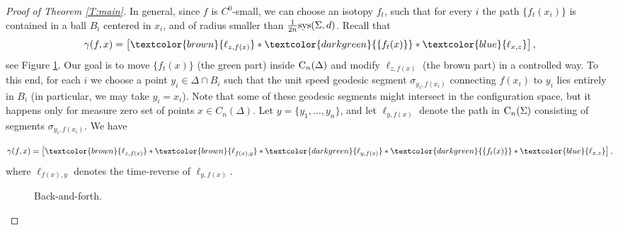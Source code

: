 \documentclass[11pt]{amsart}
\theoremstyle{definition}
\theoremstyle{remark}
\numberwithin{equation}{section}
\numberwithin{figure}{section}
\begin{document}
\begin{proof}[Proof of Theorem \ref{T:main}]
In general, since $f$ is $C^0$-small,
we can choose an isotopy $f_t$, such that for every $i$ the path $\{f_t(x_i)\}$ is contained in a ball $B_i$ centered in $x_i$, and of radius smaller than $\frac{1}{2n}{\rm sys}(\Sigma,d)$. 
Recall that 
\begin{equation}
\gamma(f,x) = \left[ \textcolor{brown}{\ell_{z,f(x)}}*\textcolor{darkgreen}{\{f_t(x)\}}*\textcolor{blue}{\ell_{x,z}} \right],
\end{equation}
 see Figure \ref{F:back-and-forth}. Our goal is to move $\{f_t(x)\}$ (the green part) inside ${\rm C}_n(\Delta)$ and modify $\ell_{z,f(x)}$ (the brown part) in a controlled way. To this end, for each $i$ we choose a point $y_i \in \Delta \cap B_i$ such that the unit speed geodesic segment $\sigma_{y_i,f(x_i)}$ connecting $f(x_i)$ to $y_i$ lies entirely in $B_i$ (in particular, we may take $y_i = x_i$). Note that some of these geodesic segments might intersect in the configuration space, but it happens only for measure zero set of points $x \in C_n(\Delta)$. Let $y = \{y_1,\ldots,y_n\}$, and let $\ell_{y,f(x)}$ denote the path in ${\rm C}_n(\Sigma)$ consisting of segments $\sigma_{y_i,f(x_i)}$. We have

\begin{equation}
\gamma(f,x) = \left[ \textcolor{brown}{\ell_{z,f(x)}}*\textcolor{brown}{\ell_{f(x),y}}*\textcolor{darkgreen}{\ell_{y,f(x)}}*\textcolor{darkgreen}{\{f_t(x)\}}*\textcolor{blue}{\ell_{x,z}} \right],
\end{equation}
where $\ell_{f(x),y}$ denotes the time-reverse of $\ell_{y,f(x)}$.

\begin{figure}[h]
\centering
{}
\caption{Back-and-forth.}
\label{F:back-and-forth}
\end{figure}


\end{proof}
\end{document}
